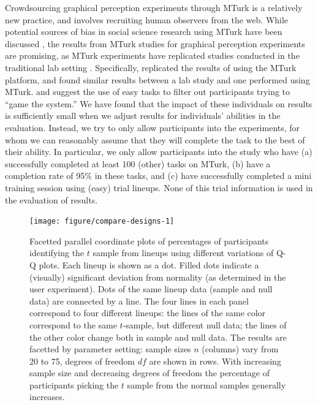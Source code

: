\documentclass[12pt]{article}\usepackage[]{graphicx}\usepackage[]{color}
\newenvironment{knitrout}{}{} %
\newcommand{\hh}[1]{{\color{magenta} #1}}
\begin{document}
Crowdsourcing graphical perception experiments through MTurk is a relatively new practice, and involves recruiting human observers from the web. While potential sources of bias in social science research using MTurk have been discussed \cite[see, for example,][]{chandler:2014}, the results from MTurk studies for graphical perception experiments are promising, as MTurk experiments have replicated studies conducted in the traditional lab setting \citep{Kosara:2010, Heer:2010}. Specifically, \citet{Heer:2010} replicated the results of \citet{cleveland:1984} using the MTurk platform, and \citet{Kosara:2010} found similar results between a lab study and one performed using MTurk. \citet{Kosara:2010} and \citet{Heer:2010} suggest the use of easy tasks to filter out participants  trying to ``game the system.'' We have found that the impact of these individuals on results is sufficiently small when we adjust results for individuals' abilities in the evaluation. Instead, we try to only allow participants into the experiments, for whom we can reasonably assume that they will complete the task to  the best of their ability.  In particular, we only allow participants into the study who have (a) successfully completed at least 100 (other) tasks on MTurk, (b) have a completion rate of 95\% in these tasks, and (c) have successfully completed a mini training session using (easy) trial lineups. None of this  trial information is used in the evaluation of results.


%






\begin{figure}[ht]
\centering
\begin{knitrout}
\color{fgcolor}
\texttt{[image: figure/compare-designs-1]} 

\end{knitrout}
\caption{\label{fig:compare} \hh{Facetted parallel coordinate plots of} percentages of participants identifying the $t$ sample from lineups using different variations of Q-Q plots. Each lineup is shown as a dot. Filled dots indicate a (visually) significant deviation from normality (as determined in the user experiment). Dots of the same lineup data (sample and null data) are connected by a line.
The four lines in each panel correspond to four different lineups: the lines of the same color correspond to the same $t$-sample, but different null data; the lines of the other color change both in sample and null data. The results are facetted by parameter setting: sample sizes $n$ (columns) vary from 20 to 75, degrees of freedom $df$ are shown in rows. With increasing sample size and decreasing degrees of freedom the percentage of participants picking the $t$ sample  from the normal samples generally increases.
}
\end{figure}
\afterpage{\clearpage}
\end{document}
